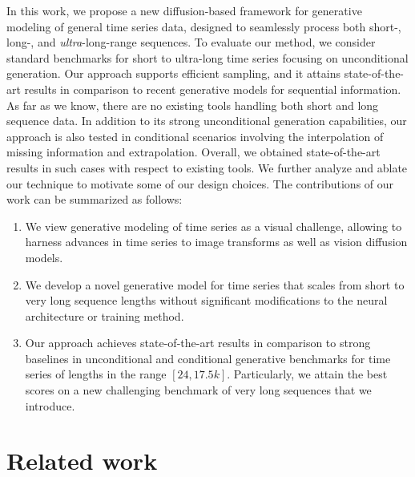 \documentclass{article}
\begin{document}
In this work, we propose a new diffusion-based framework for generative modeling of general time series data, designed to seamlessly process both short-, long-, and \emph{ultra}-long-range sequences. To evaluate our method, we consider standard benchmarks for short to ultra-long time series focusing on unconditional generation. Our approach supports efficient sampling, and it attains state-of-the-art results in comparison to recent generative models for sequential information. As far as we know, there are no existing tools handling both short and long sequence data. In addition to its strong unconditional generation capabilities, our approach is also tested in conditional scenarios involving the interpolation of missing information and extrapolation. Overall, we obtained state-of-the-art results in such cases with respect to existing tools. We further analyze and ablate our technique to motivate some of our design choices. The contributions of our work can be summarized as follows:
\begin{enumerate}[wide, labelwidth=!, labelindent=2pt]
    \item We view generative modeling of time series as a visual challenge, allowing to harness advances in time series to image transforms as well as vision diffusion models.

    \item We develop a novel generative model for time series that scales from short to very long sequence lengths without significant modifications to the neural architecture or training method.

    
    \item Our approach achieves state-of-the-art results in comparison to strong baselines in unconditional and conditional generative benchmarks for time series of lengths in the range $[24, 17.5k]$. Particularly, we attain the best scores on a new challenging benchmark of very long sequences that we introduce.
\end{enumerate}


\section{Related work}
\end{document}
